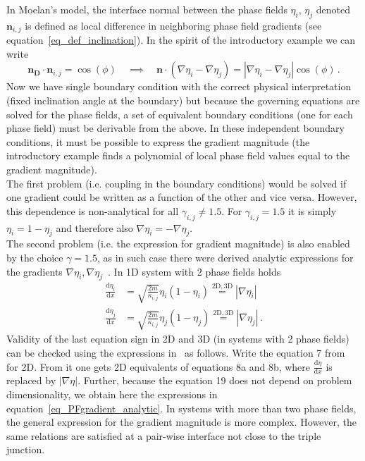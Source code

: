 	In Moelan's model, the interface normal between the phase fields $\eta_i,\,\eta_j$ denoted $\bm{n}_{i,j}$ is defined as local difference in neighboring phase field gradients (see equation~\ref{eq_def_inclination}). In the spirit of the introductory example we can write
	\begin{equation}
		\bm{n_D}\cdot\bm{n}_{i,j} = \cos(\phi) \quad \implies \quad \bm{n}\cdot(\nabla\eta_i-\nabla\eta_j) = |\nabla\eta_i-\nabla\eta_j|\cos(\phi) \,.
	\end{equation}
	Now we have single boundary condition with the correct physical interpretation (fixed inclination angle at the boundary) but because the governing equations are solved for the phase fields, a set of equivalent boundary conditions (one for each phase field) must be derivable from the above. In these independent boundary conditions, it must be possible to express the gradient magnitude (the introductory example finds a polynomial of local phase field values equal to the gradient magnitude). \\
	The first problem (i.e. coupling in the boundary conditions) would be solved if one gradient could be written as a function of the other and vice versa. However, this dependence is non-analytical for all $\gamma_{i,j}\neq1.5$. For $\gamma_{i,j}=1.5$ it is simply $\eta_i = 1-\eta_j$ and therefore also $\nabla\eta_i=-\nabla\eta_j$.~\cite{Moelans2008} \\
	The second problem (i.e. the expression for gradient magnitude) is also enabled by the choice $\gamma=1.5$, as in such case there were derived analytic expressions for the gradients $\nabla\eta_i,\nabla\eta_j$~\cite{Moelans2008}. In 1D system with 2 phase fields holds
	\begin{equation} \label{eq_PFgradient_analytic}
		\begin{split}
			\frac{\mathrm{d}\eta_i}{\mathrm{d}x} &= \sqrt{\frac{2m}{\kappa_{i,j}}}\eta_i(1-\eta_i) \overset{\mathrm{2D, 3D}}{=} |\nabla\eta_i| \\
			\frac{\mathrm{d}\eta_j}{\mathrm{d}x} &= \sqrt{\frac{2m}{\kappa_{i,j}}}\eta_j(1-\eta_j) \overset{\mathrm{2D, 3D}}{=} |\nabla\eta_j| \,.
		\end{split}
	\end{equation}
	Validity of the last equation sign in 2D and 3D (in systems with 2 phase fields) can be checked using the expressions in~\cite{Moelans2008} as follows. Write the equation 7 from~\cite{Moelans2008} for 2D. From it one gets 2D equivalents of equations 8a and 8b, where $\frac{\mathrm{d}\eta}{\mathrm{d}x}$ is replaced by $|\nabla\eta|$. Further, because the equation 19 does not depend on problem dimensionality, we obtain here the expressions in equation~\ref{eq_PFgradient_analytic}. In systems with more than two phase fields, the general expression for the gradient magnitude is more complex. However, the same relations are satisfied at a pair-wise interface not close to the triple junction. \\
